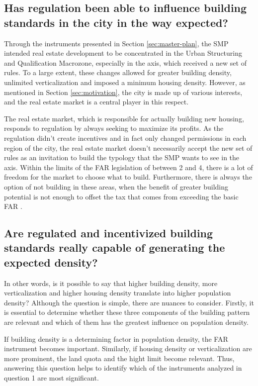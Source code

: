 \subsection*{Has regulation been able to influence building standards in the city in the way expected?}

Through the instruments presented in Section \ref{sec:master-plan}, the SMP intended real estate development to be concentrated in the Urban Structuring and Qualification Macrozone, especially in the axis, which received a new set of rules. To a large extent, these changes allowed for greater building density, unlimited verticalization and imposed a minimum housing density. However, as mentioned in Section \ref{sec:motivation}, the city is made up of various interests, and the real estate market is a central player in this respect.

The real estate market, which is responsible for actually building new housing, responds to regulation by always seeking to maximize its profits. As the regulation didn't create incentives and in fact only changed permissions in each region of the city, the real estate market doesn't necessarily accept the new set of rules as an invitation to build the typology that the SMP wants to see in the axis. Within the limits of the FAR legislation of between 2 and 4, there is a lot of freedom for the market to choose what to build. Furthermore, there is always the option of not building in these areas, when the benefit of greater building potential is not enough to offset the tax that comes from exceeding the basic FAR .

\subsection*{Are regulated and incentivized building standards really capable of generating the expected density?}

In other words, is it possible to say that higher building density, more verticalization and higher housing density translate into higher population density? Although the question is simple, there are nuances to consider. Firstly, it is essential to determine whether these three components of the building pattern are relevant and which of them has the greatest influence on population density.

If building density is a determining factor in population density, the FAR instrument becomes important. Similarly, if housing density or verticalization are more prominent, the land quota and the hight limit become relevant. Thus, answering this question helps to identify which of the instruments analyzed in question 1 are most significant.

